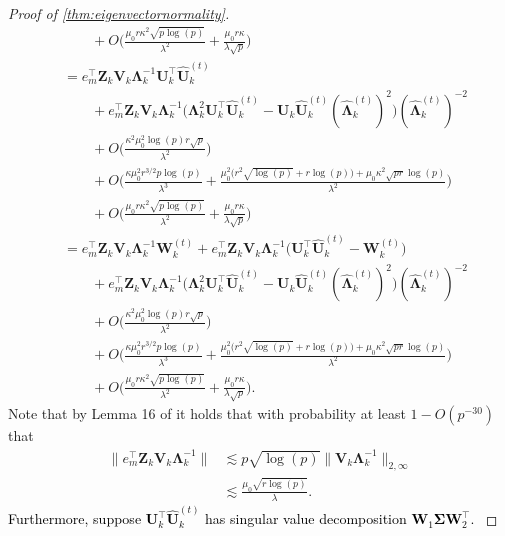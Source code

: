\documentclass[10pt]{article}
\newcommand{\0}{{\mathbf{0}}}
\newcommand{\1}{{\mathbf{1}}}
\newcommand{\U}{{\mathbf{U}}}
\renewcommand{\citet}{\cite}
\renewcommand{\t}{^{\top}}
\newcommand{\uhat}{\mathbf{\hat{U}}}
\newcommand{\inv}{^{-1}}
\renewcommand{\hat}{\widehat}
\renewcommand{\hat}{\widehat}
\begin{document}
\begin{proof}[Proof of \cref{thm:eigenvectornormality}]
\begin{align*}
    &\qquad + O\bigg( \frac{\mu_0 r \kappa^2 \sqrt{p\log(p)}}{\lambda^2} + \frac{\mu_0 r \kappa}{\lambda \sqrt{p}} \bigg) \\
    &= e_m\t \mathbf{Z}_k \mathbf{V}_k \mathbf{\Lambda}_k\inv \U_k\t \uhat_k^{(t)} \\
    &\qquad + e_m\t \mathbf{Z}_k \mathbf{V}_k \mathbf{\Lambda}_k\inv \bigg( \mathbf{\Lambda}_k^2 \U_k\t \uhat_k^{(t)} - \U_k \uhat_k^{(t)} (\mathbf{\hat{\Lambda}}_k^{(t)})^2 \bigg) (\mathbf{\hat{\Lambda}}_k^{(t)})^{-2} \\
    &\qquad + O\bigg( \frac{\kappa^2 \mu_0^2 \log(p) r \sqrt{p}}{\lambda^2} \bigg) \\
    &\qquad + O\bigg( \frac{\kappa \mu_0^2 r^{3/2}p \log(p)}{\lambda^3} + \frac{\mu_0^2 \big( r^2 \sqrt{\log(p)} + r \log(p)\big) + \mu_0 \kappa^2 \sqrt{pr} \log(p)}{\lambda^2} \bigg) \\
    &\qquad + O\bigg( \frac{\mu_0 r \kappa^2 \sqrt{p\log(p)}}{\lambda^2} + \frac{\mu_0 r \kappa}{\lambda \sqrt{p}} \bigg) \\
    &= e_m\t \mathbf{Z}_k \mathbf{V}_k \mathbf{\Lambda}_k\inv \mathbf{W}_k^{(t)} + e_m\t \mathbf{Z}_k \mathbf{V}_k \mathbf{\Lambda}_k\inv \bigg( \U_k\t \uhat_k^{(t)} - \mathbf{W}_k^{(t)} \bigg) \\
    &\qquad + e_m\t \mathbf{Z}_k \mathbf{V}_k \mathbf{\Lambda}_k\inv \bigg( \mathbf{\Lambda}_k^2 \U_k\t \uhat_k^{(t)} - \U_k \uhat_k^{(t)} (\mathbf{\hat{\Lambda}}_k^{(t)})^2 \bigg) (\mathbf{\hat{\Lambda}}_k^{(t)})^{-2} \\
    &\qquad + O\bigg( \frac{\kappa^2 \mu_0^2 \log(p) r \sqrt{p}}{\lambda^2} \bigg) \\
    &\qquad + O\bigg( \frac{\kappa \mu_0^2 r^{3/2}p \log(p)}{\lambda^3} + \frac{\mu_0^2 \big( r^2 \sqrt{\log(p)} + r \log(p)\big) + \mu_0 \kappa^2 \sqrt{pr} \log(p)}{\lambda^2} \bigg) \\
     &\qquad + O\bigg( \frac{\mu_0 r \kappa^2 \sqrt{p\log(p)}}{\lambda^2} + \frac{\mu_0 r \kappa}{\lambda \sqrt{p}} \bigg).
\end{align*}
Note that by Lemma 16 of \citet{agterberg_estimating_2022} it holds that with probability at least $1 - O(p^{-30})$ that
\begin{align*}
    \| e_m\t \mathbf{Z}_k \mathbf{V}_k \mathbf{\Lambda}_k\inv \| &\lesssim p \sqrt{\log(p)} \| \mathbf{V}_k \mathbf{\Lambda}_k\inv \|_{2,\infty} \\
    &\lesssim \frac{\mu_0 \sqrt{r\log(p)} }{\lambda}.
\end{align*}
\textcolor{black}{Furthermore, suppose $\U_k\t \uhat_k^{(t)}$ has singular value decomposition  $\mathbf{W}_1 \mathbf{\Sigma} \mathbf{W}_2\t$. 
}
\end{proof}
\end{document}
